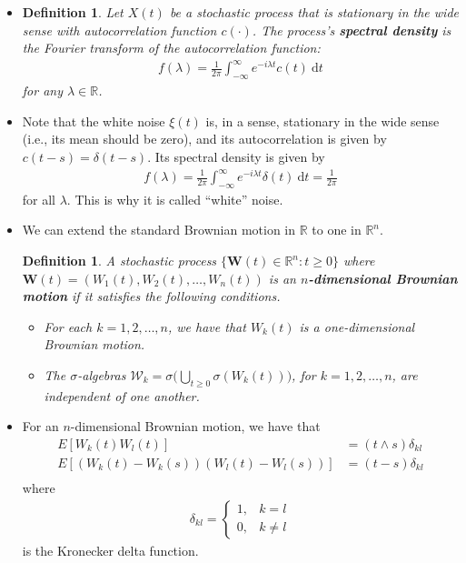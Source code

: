 \documentclass[10pt]{article}
\newtheorem{definition}[lemma]{Definition}
\newcommand{\dee}{\mathrm{d}}
\newcommand{\ve}[1]{\mathbf{#1}}
\newcommand{\mcal}[1]{\mathcal{#1}}
\newcommand{\Real}{\mathbb{R}}
\begin{document}
\begin{itemize}
  \item \begin{definition}
    Let $X(t)$ be a stochastic process that is stationary in the wide sense with autocorrelation function $c(\cdot)$. The process's {\bf spectral density} is the Fourier transform of the autocorrelation function:
    \begin{align*}
      f(\lambda) = \frac{1}{2\pi} \int_{-\infty}^\infty e^{-i\lambda t} c(t)\ \dee t
    \end{align*}
    for any $\lambda \in \Real$.
  \end{definition}  

  \item Note that the white noise $\xi(t)$ is, in a sense, stationary in the wide sense (i.e., its mean should be zero), and its autocorrelation is given by $c(t-s) = \delta(t-s)$. Its spectral density is given by
  \begin{align*}
    f(\lambda) = \frac{1}{2\pi} \int_{-\infty}^\infty e^{-i\lambda t} \delta(t) \ \dee t = \frac{1}{2\pi}
  \end{align*}
  for all $\lambda$. This is why it is called ``white'' noise.  

  \item We can extend the standard Brownian motion in $\Real$ to one in $\Real^n$.
  \begin{definition}
    A stochastic process $\{ \ve{W}(t) \in \Real^n : t \geq 0 \}$ where $\ve{W}(t) = (W_1(t), W_2(t), \dotsc, W_n(t))$ is an {\bf $n$-dimensional Brownian motion} if it satisfies the following conditions.
    \begin{itemize}
      \item For each $k = 1, 2, \dotsc, n$, we have that $W_k(t)$ is a one-dimensional Brownian motion.
      \item The $\sigma$-algebras
      $\mcal{W}_k = \sigma\bigg( \bigcup_{t \geq 0} \sigma(W_k(t)) \bigg)$,
      for $k = 1, 2, \dotsc, n$, are independent of one another.
    \end{itemize}
  \end{definition}

  \item For an $n$-dimensional Brownian motion, we have that
  \begin{align*}
    E[W_k(t)W_l(t)] &= (t \wedge s)\delta_{kl} \\
    E[(W_k(t) - W_k(s))(W_l(t) - W_l(s))] &= (t - s)\delta_{kl} \\
  \end{align*}
  where 
  \begin{align*}
    \delta_{kl} = \begin{cases}
      1, & k = l \\
      0, & k \neq l
    \end{cases}
  \end{align*}
  is the Kronecker delta function.    
\end{itemize}
\end{document}
